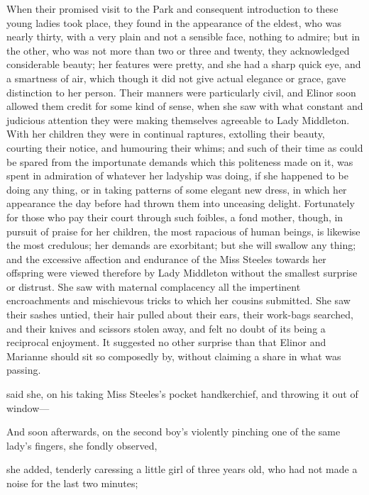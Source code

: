 When their promised visit to the Park and consequent introduction to these young ladies took place, they found in the appearance of the eldest, who was nearly thirty, with a very plain and not a sensible face, nothing to admire; but in the other, who was not more than two or three and twenty, they acknowledged considerable beauty; her features were pretty, and she had a sharp quick eye, and a smartness of air, which though it did not give actual elegance or grace, gave distinction to her person. Their manners were particularly civil, and Elinor soon allowed them credit for some kind of sense, when she saw with what constant and judicious attention they were making themselves agreeable to Lady Middleton. With her children they were in continual raptures, extolling their beauty, courting their notice, and humouring their whims; and such of their time as could be spared from the importunate demands which this politeness made on it, was spent in admiration of whatever her ladyship was doing, if she happened to be doing any thing, or in taking patterns of some elegant new dress, in which her appearance the day before had thrown them into unceasing delight. Fortunately for those who pay their court through such foibles, a fond mother, though, in pursuit of praise for her children, the most rapacious of human beings, is likewise the most credulous; her demands are exorbitant; but she will swallow any thing; and the excessive affection and endurance of the Miss Steeles towards her offspring were viewed therefore by Lady Middleton without the smallest surprise or distrust. She saw with maternal complacency all the impertinent encroachments and mischievous tricks to which her cousins submitted. She saw their sashes untied, their hair pulled about their ears, their work-bags searched, and their knives and scissors stolen away, and felt no doubt of its being a reciprocal enjoyment. It suggested no other surprise than that Elinor and Marianne should sit so composedly by, without claiming a share in what was passing.

 said she, on his taking Miss Steeles's pocket handkerchief, and throwing it out of window---

And soon afterwards, on the second boy's violently pinching one of the same lady's fingers, she fondly observed, 

 she added, tenderly caressing a little girl of three years old, who had not made a noise for the last two minutes; 


